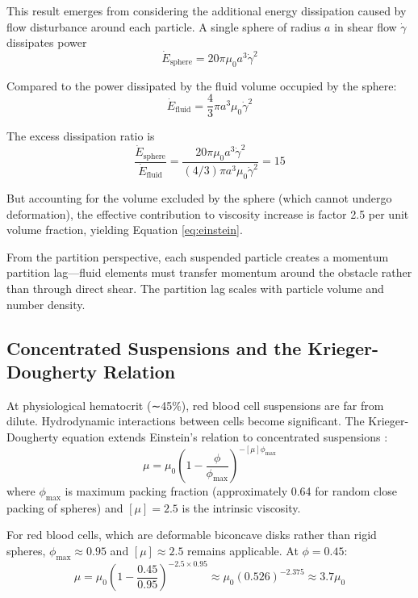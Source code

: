 \documentclass[10pt,twocolumn,a4paper]{article}
\theoremstyle{remark}
\begin{document}
This result emerges from considering the additional energy dissipation caused by flow disturbance around each particle. A single sphere of radius $a$ in shear flow $\dot{\gamma}$ dissipates power
\begin{equation}
\dot{E}_{\mathrm{sphere}} = 20\pi \mu_{0} a^{3} \dot{\gamma}^{2}
\end{equation}

Compared to the power dissipated by the fluid volume occupied by the sphere:
\begin{equation}
\dot{E}_{\mathrm{fluid}} = \frac{4}{3}\pi a^{3} \mu_{0} \dot{\gamma}^{2}
\end{equation}

The excess dissipation ratio is
\begin{equation}
\frac{\dot{E}_{\mathrm{sphere}}}{\dot{E}_{\mathrm{fluid}}} = \frac{20\pi \mu_{0} a^{3} \dot{\gamma}^{2}}{(4/3)\pi a^{3} \mu_{0} \dot{\gamma}^{2}} = 15
\end{equation}

But accounting for the volume excluded by the sphere (which cannot undergo deformation), the effective contribution to viscosity increase is factor 2.5 per unit volume fraction, yielding Equation \ref{eq:einstein}.

From the partition perspective, each suspended particle creates a momentum partition lag—fluid elements must transfer momentum around the obstacle rather than through direct shear. The partition lag scales with particle volume and number density.

\subsection{Concentrated Suspensions and the Krieger-Dougherty Relation}

At physiological hematocrit (∼45\%), red blood cell suspensions are far from dilute. Hydrodynamic interactions between cells become significant. The Krieger-Dougherty equation extends Einstein's relation to concentrated suspensions \cite{krieger1959mechanism}:
\begin{equation}
\mu = \mu_{0}\left(1 - \frac{\phi}{\phi_{\max}}\right)^{-[\mu]\phi_{\max}}
\end{equation}
where $\phi_{\max}$ is maximum packing fraction (approximately 0.64 for random close packing of spheres) and $[\mu] = 2.5$ is the intrinsic viscosity.

For red blood cells, which are deformable biconcave disks rather than rigid spheres, $\phi_{\max} \approx 0.95$ and $[\mu] \approx 2.5$ remains applicable. At $\phi = 0.45$:
\begin{equation}
\mu = \mu_{0}\left(1 - \frac{0.45}{0.95}\right)^{-2.5 \times 0.95} \approx \mu_{0}(0.526)^{-2.375} \approx 3.7\mu_{0}
\end{equation}
\end{document}
